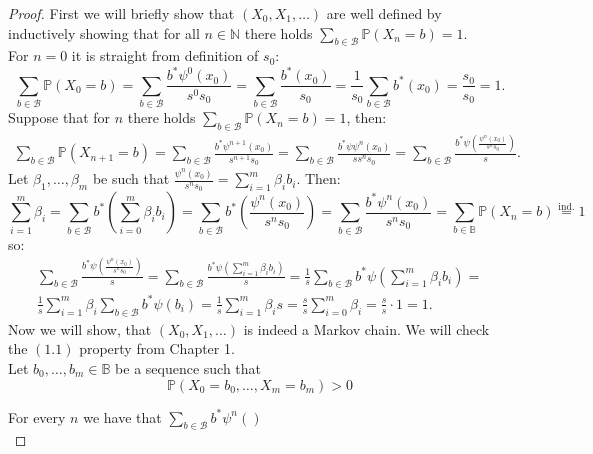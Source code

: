 \documentclass[a4paper, 12pt]{report}
\newcommand{\ndotsm}[3]{{#1}_{#2}, \dots, {#1}_{#3}}
\begin{document}
\begin{proof}
First we will briefly show that $(X_0, X_1, \dots)$ are well defined by inductively showing that for all
$n \in \mathbb{N}$ there holds $\displaystyle\sum_{b \in \mathcal{B}}\mathbb{P}(X_n = b) = 1$. \\
For $n = 0$ it is straight from definition of $s_0$:
\begin{equation*}
    \sum_{b \in \mathcal{B}}\mathbb{P}(X_0 = b) = \sum_{b \in \mathcal{B}}\frac{b^*\psi^0(x_0)}{s^0s_0} =
    \sum_{b \in \mathcal{B}}\frac{b^*(x_0)}{s_0} = \frac{1}{s_0}\sum_{b \in \mathcal{B}}b^*(x_0) =
    \frac{s_0}{s_0}=1.
\end{equation*}
Suppose that for $n$ there holds $\displaystyle\sum_{b \in \mathcal{B}}\mathbb{P}(X_n = b) = 1$, then:
\begin{gather*}
    \sum_{b\in\mathcal{B}}\mathbb{P}(X_{n+1} = b) =
    \sum_{b\in\mathcal{B}}\frac{b^*\psi^{n+1}(x_0)}{s^{n+1}s_0} =
    \sum_{b\in\mathcal{B}}\frac{b^*\psi\psi^n(x_0)}{ss^ns_0} =
    \sum_{b \in\mathcal{B}}\frac{b^*\psi\left(\frac{\psi^n(x_0)}{s^{n}s_0}\right)}{s}.
\end{gather*}
Let $\ndotsm{\beta}{1}{m}$ be such that $\frac{\psi^n(x_0)}{s^ns_0} = \displaystyle\sum_{i = 1}^m\beta_ib_i$.
Then:
\begin{equation*}
    \sum_{i = 1}^m \beta_i = \sum_{b \in \mathcal{B}} b^*\left(\sum_{i=0}^m\beta_ib_i\right)=
    \sum_{b \in \mathcal{B}} b^*\left(\frac{\psi^n(x_0)}{s^ns_0}\right) = \sum_{b \in \mathcal{B}}
    \frac{b^*\psi^n(x_0)}{s^ns_0} = \sum_{b \in \mathbb{B}}\mathbb{P}(X_n = b) \overset{\mathrm{ind.}}{=}1
\end{equation*}
so:
\begin{gather*}
    \sum_{b \in\mathcal{B}}\frac{b^*\psi\left(\frac{\psi^n(x_0)}{s^{n}s_0}\right)}{s} =
    \sum_{b \in\mathcal{B}}\frac{b^*\psi\left(\displaystyle\sum_{i = 1}^m\beta_ib_i\right)}{s} =
    \frac{1}{s}\sum_{b \in \mathcal{B}}b^*\psi\left(\sum_{i=1}^m\beta_ib_i\right) = \\
    \frac{1}{s}\sum_{i=1}^m\beta_i\sum_{b \in \mathcal{B}}b^*\psi(b_i) =
    \frac{1}{s}\sum_{i=1}^m\beta_is = \frac{s}{s}\sum_{i = 0}^m\beta_i = \frac{s}{s}\cdot1=1.
\end{gather*}
Now we will show, that $(X_0, X_1, \dots)$ is indeed a Markov chain. We will check the $(1.1)$ property from
Chapter 1. \\
Let $\ndotsm{b}{0}{m} \in \mathbb{B}$ be a sequence such that
\begin{equation*}
    \mathbb{P}(X_0 = b_0, \dots, X_m = b_m) > 0
\end{equation*}

For every $n$ we have that $\displaystyle\sum_{b \in \mathcal{B}} b^*\psi^n()$ \\

\end{proof}
\end{document}
